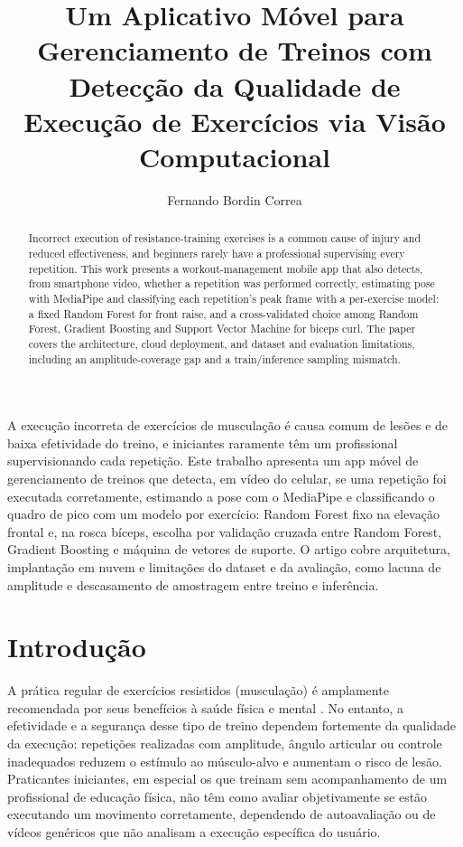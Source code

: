 \documentclass[12pt]{article}
\title{Um Aplicativo Móvel para Gerenciamento de Treinos com Detecção da Qualidade de Execução de Exercícios via Visão Computacional}
\author{Fernando Bordin Correa\inst{1}}
\begin{document}
\maketitle

\begin{abstract}
  Incorrect execution of resistance-training exercises is a common cause
  of injury and reduced effectiveness, and beginners rarely have a
  professional supervising every repetition. This work presents a
  workout-management mobile app that also detects, from smartphone video,
  whether a repetition was performed correctly, estimating pose with
  MediaPipe and classifying each repetition's peak frame with a
  per-exercise model: a fixed Random Forest for front raise, and a
  cross-validated choice among Random Forest, Gradient Boosting and
  Support Vector Machine for biceps curl. The paper covers the
  architecture, cloud deployment, and dataset and evaluation limitations,
  including an amplitude-coverage gap and a train/inference sampling
  mismatch.
\end{abstract}

\begin{resumo}
  A execução incorreta de exercícios de musculação é causa comum de
  lesões e de baixa efetividade do treino, e iniciantes raramente têm um
  profissional supervisionando cada repetição. Este trabalho apresenta um
  app móvel de gerenciamento de treinos que detecta, em vídeo do celular,
  se uma repetição foi executada corretamente, estimando a pose
  com o MediaPipe e classificando o quadro de pico com um modelo por
  exercício: Random Forest fixo na elevação frontal e, na rosca bíceps,
  escolha por validação cruzada entre Random Forest, Gradient Boosting e
  máquina de vetores de suporte. O artigo cobre arquitetura, implantação
  em nuvem e limitações do dataset e da avaliação, como lacuna de
  amplitude e descasamento de amostragem entre treino e inferência.
\end{resumo}

\section{Introdução}

A prática regular de exercícios resistidos (musculação) é amplamente
recomendada por seus benefícios à saúde física e mental
\cite{worldhealth2020}. No entanto, a efetividade e a segurança desse tipo
de treino dependem fortemente da qualidade da execução: repetições
realizadas com amplitude, ângulo articular ou controle inadequados reduzem
o estímulo ao músculo-alvo e aumentam o risco de lesão. Praticantes
iniciantes, em especial os que treinam sem acompanhamento de um
profissional de educação física, não têm como avaliar objetivamente se
estão executando um movimento corretamente, dependendo de autoavaliação ou
de vídeos genéricos que não analisam a execução específica do usuário.
\end{document}
